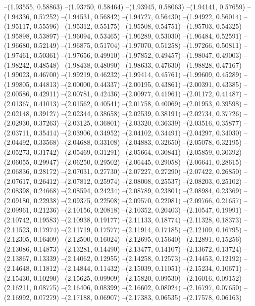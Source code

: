 --(1.93555, 0.58863)
--(1.93750, 0.58464)
--(1.93945, 0.58063)
--(1.94141, 0.57659)
--(1.94336, 0.57252)
--(1.94531, 0.56842)
--(1.94727, 0.56430)
--(1.94922, 0.56014)
--(1.95117, 0.55596)
--(1.95312, 0.55175)
--(1.95508, 0.54751)
--(1.95703, 0.54325)
--(1.95898, 0.53897)
--(1.96094, 0.53465)
--(1.96289, 0.53030)
--(1.96484, 0.52591)
--(1.96680, 0.52149)
--(1.96875, 0.51704)
--(1.97070, 0.51258)
--(1.97266, 0.50811)
--(1.97461, 0.50361)
--(1.97656, 0.49910)
--(1.97852, 0.49457)
--(1.98047, 0.49003)
--(1.98242, 0.48548)
--(1.98438, 0.48090)
--(1.98633, 0.47630)
--(1.98828, 0.47167)
--(1.99023, 0.46700)
--(1.99219, 0.46232)
--(1.99414, 0.45761)
--(1.99609, 0.45289)
--(1.99805, 0.44813)
--(2.00000, 0.44337)
--(2.00195, 0.43861)
--(2.00391, 0.43385)
--(2.00586, 0.42911)
--(2.00781, 0.42436)
--(2.00977, 0.41961)
--(2.01172, 0.41487)
--(2.01367, 0.41013)
--(2.01562, 0.40541)
--(2.01758, 0.40069)
--(2.01953, 0.39598)
--(2.02148, 0.39127)
--(2.02344, 0.38658)
--(2.02539, 0.38191)
--(2.02734, 0.37726)
--(2.02930, 0.37263)
--(2.03125, 0.36801)
--(2.03320, 0.36339)
--(2.03516, 0.35877)
--(2.03711, 0.35414)
--(2.03906, 0.34952)
--(2.04102, 0.34491)
--(2.04297, 0.34030)
--(2.04492, 0.33568)
--(2.04688, 0.33108)
--(2.04883, 0.32650)
--(2.05078, 0.32195)
--(2.05273, 0.31742)
--(2.05469, 0.31291)
--(2.05664, 0.30841)
--(2.05859, 0.30392)
--(2.06055, 0.29947)
--(2.06250, 0.29502)
--(2.06445, 0.29058)
--(2.06641, 0.28615)
--(2.06836, 0.28172)
--(2.07031, 0.27730)
--(2.07227, 0.27290)
--(2.07422, 0.26850)
--(2.07617, 0.26412)
--(2.07812, 0.25974)
--(2.08008, 0.25537)
--(2.08203, 0.25102)
--(2.08398, 0.24668)
--(2.08594, 0.24234)
--(2.08789, 0.23801)
--(2.08984, 0.23369)
--(2.09180, 0.22938)
--(2.09375, 0.22508)
--(2.09570, 0.22081)
--(2.09766, 0.21657)
--(2.09961, 0.21236)
--(2.10156, 0.20818)
--(2.10352, 0.20403)
--(2.10547, 0.19991)
--(2.10742, 0.19583)
--(2.10938, 0.19177)
--(2.11133, 0.18774)
--(2.11328, 0.18373)
--(2.11523, 0.17974)
--(2.11719, 0.17577)
--(2.11914, 0.17185)
--(2.12109, 0.16795)
--(2.12305, 0.16409)
--(2.12500, 0.16024)
--(2.12695, 0.15640)
--(2.12891, 0.15256)
--(2.13086, 0.14873)
--(2.13281, 0.14490)
--(2.13477, 0.14107)
--(2.13672, 0.13724)
--(2.13867, 0.13339)
--(2.14062, 0.12955)
--(2.14258, 0.12573)
--(2.14453, 0.12192)
--(2.14648, 0.11812)
--(2.14844, 0.11432)
--(2.15039, 0.11051)
--(2.15234, 0.10671)
--(2.15430, 0.10290)
--(2.15625, 0.09909)
--(2.15820, 0.09530)
--(2.16016, 0.09152)
--(2.16211, 0.08775)
--(2.16406, 0.08399)
--(2.16602, 0.08024)
--(2.16797, 0.07650)
--(2.16992, 0.07279)
--(2.17188, 0.06907)
--(2.17383, 0.06535)
--(2.17578, 0.06163)
